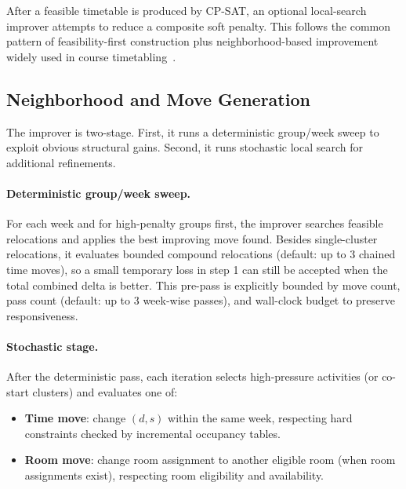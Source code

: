 After a feasible timetable is produced by CP-SAT, an optional local-search improver attempts to reduce a composite soft penalty.
This follows the common pattern of feasibility-first construction plus neighborhood-based improvement widely used in course timetabling~\cite{lewis2008metaheuristics,bettinelli2015overview}.

\subsection{Neighborhood and Move Generation}
The improver is two-stage. First, it runs a deterministic group/week sweep to exploit obvious structural gains. Second, it runs stochastic local search for additional refinements.

\paragraph{Deterministic group/week sweep.}
For each week and for high-penalty groups first, the improver searches feasible relocations and applies the best improving move found.
Besides single-cluster relocations, it evaluates bounded compound relocations (default: up to 3 chained time moves), so a small temporary loss in step 1 can still be accepted when the total combined delta is better.
This pre-pass is explicitly bounded by move count, pass count (default: up to 3 week-wise passes), and wall-clock budget to preserve responsiveness.

\paragraph{Stochastic stage.}
After the deterministic pass, each iteration selects high-pressure activities (or co-start clusters) and evaluates one of:
\begin{itemize}[leftmargin=*]
  \item \textbf{Time move}: change $(d,s)$ within the same week, respecting hard constraints checked by incremental occupancy tables.
  \item \textbf{Room move}: change room assignment to another eligible room (when room assignments exist), respecting room eligibility and availability.
\end{itemize}

